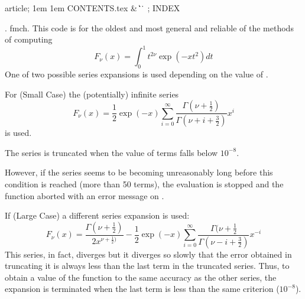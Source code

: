 


\Wbegin[;]
{article;}
{1em}
{1em}
{CONTENTS.tex}
{ %
 {\&\WRS}
 {\|}
 {\>\WUC}
 {\>\WUC}
 {\>\WUC}
 {\@}
 {\.\.}
 {\.}
 {}
}
{\M}
{;}
{INDEX}






\FWEBtoc

.  fmch. This  code is for the oldest and most general
and reliable of the methods of computing
\[
 F_\nu (x)  = \int_0^1 t^{2 \nu} \exp (-x t^2) dt
\]
One of two possible series expansions is used depending on the
value of .

For  (Small  Case) the (potentially) infinite
series
\[
F_\nu (x)  = \frac{1}{2} \exp(-x) \sum_{i=0}^{\infty}
   \frac{\Gamma (\nu + \frac{1}{2} )}
   {\Gamma (\nu + i + \frac{3}{2} ) }
    x^i
\]
is used.

The series is truncated when the value of terms falls below
$10^{-8}$.

However, if the series seems to be becoming unreasonably
long before this condition is reached (more than 50 terms), the
evaluation is stopped and the function aborted with an
error message
on .

If  (Large  Case) a different series
expansion is used:
\[
F_\nu (x)  =  \frac{\Gamma (\nu + \frac{1}{2} )}
          {2x^{\nu + \frac{1}{2} ) }}
- \frac{1}{2} \exp(-x) \sum_{i=0}^{\infty}
   \frac{\Gamma (\nu + \frac{1}{2} }
   {\Gamma (\nu - i + \frac{3}{2} ) }
    x^{-i}
\]
This series, in fact, diverges but it diverges
so slowly that the error
obtained in truncating it is always less than
the last term in the
truncated series. Thus, to obtain a value of the function to the
same accuracy as the other series,
the expansion is terminated when the
last term is less than the same criterion ($10^{-8}$).

